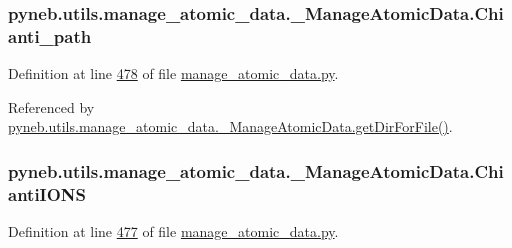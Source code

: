 \hypertarget{classpyneb_1_1utils_1_1manage__atomic__data_1_1___manage_atomic_data_a898e51085e3461333ea9df3a3fce3599}{
\subsubsection[{Chianti\-\_\-path}]{\setlength{\rightskip}{0pt plus 5cm}pyneb.\-utils.\-manage\-\_\-atomic\-\_\-data.\-\_\-\-Manage\-Atomic\-Data.\-Chianti\-\_\-path}}\label{classpyneb_1_1utils_1_1manage__atomic__data_1_1___manage_atomic_data_a898e51085e3461333ea9df3a3fce3599}


Definition at line \hyperlink{manage__atomic__data_8py_source_l00478}{478} of file \hyperlink{manage__atomic__data_8py_source}{manage\-\_\-atomic\-\_\-data.\-py}.



Referenced by \hyperlink{manage__atomic__data_8py_source_l00144}{pyneb.\-utils.\-manage\-\_\-atomic\-\_\-data.\-\_\-\-Manage\-Atomic\-Data.\-get\-Dir\-For\-File()}.

\hypertarget{classpyneb_1_1utils_1_1manage__atomic__data_1_1___manage_atomic_data_a06491f5f808df3d4e58b35e09db74a18}{
\subsubsection[{Chianti\-I\-O\-N\-S}]{\setlength{\rightskip}{0pt plus 5cm}pyneb.\-utils.\-manage\-\_\-atomic\-\_\-data.\-\_\-\-Manage\-Atomic\-Data.\-Chianti\-I\-O\-N\-S}}\label{classpyneb_1_1utils_1_1manage__atomic__data_1_1___manage_atomic_data_a06491f5f808df3d4e58b35e09db74a18}


Definition at line \hyperlink{manage__atomic__data_8py_source_l00477}{477} of file \hyperlink{manage__atomic__data_8py_source}{manage\-\_\-atomic\-\_\-data.\-py}.



